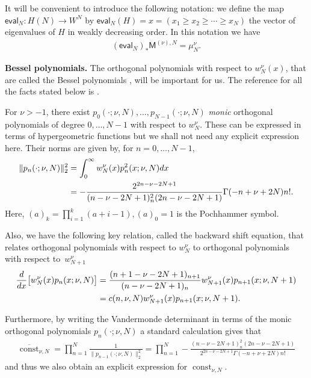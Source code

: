 \documentclass[11pt]{article}
\numberwithin{equation}{section}
\begin{document}
It will be convenient to introduce the following notation: we define the map $\mathsf{eval}_N\colon H(N) \to W^N$ by $\mathsf{eval}_N(H)=x=(x_1\ge x_2 \ge \cdots \ge x_N )$ the vector of eigenvalues of $H$ in weakly decreasing order. In this notation we have
\begin{gather*}
 (\mathsf{eval}_N )_*\mathsf{M}^{(\nu),N}=\mu_N^{\nu}.
\end{gather*}

{\bf Bessel polynomials.} The orthogonal polynomials with respect to $w_N^{\nu}(x)$, that are called the Bessel polynomials \cite{BesselPolynomials}, will be important for us. The reference for all the facts stated below is \cite[Chapter~9.13, pp.~244--247]{HypergeometricOrthogonalPolynomials}.

 For $\nu>-1$, there exist $p_0(\cdot;\nu,N),\dots,p_{N-1}(\cdot;\nu,N)$ \textit{monic} orthogonal polynomials of degree $0,\dots, N-1$ with respect to $w_N^{\nu}$. These can be expressed in terms of hypergeometric functions but we shall not need any explicit expression here. Their norms are given by, for $n=0, \dots, N-1$,
\begin{align*}
\|p_n(\cdot;\nu,N)\|_2^2&= \int_{0}^{\infty}w_N^{\nu}(x)p_n^2(x;\nu,N){\rm d}x\\
&=-\frac{2^{2n-\nu-2N+1}}{(n-\nu-2N+1)_n^2(2n-\nu-2N+1)}\Gamma(-n+\nu+2N)n!.
\end{align*}
Here, $(a)_k=\prod\limits_{i=1}^{k}(a+i-1), (a)_0=1$ is the Pochhammer symbol.

Also, we have the following key relation, called the backward shift equation, that relates orthogonal polynomials with respect to $w_N^{\nu}$ to orthogonal polynomials with respect to~$w_{N+1}^\nu$
\begin{align*}
\frac{{\rm d}}{{\rm d}x}\big[w_N^{\nu}(x)p_n(x;\nu,N)\big]&=\frac{(n+1-\nu-2N+1)_{n+1}}{(n-\nu-2N+1)_n}w_{N+1}^{\nu}(x)p_{n+1}(x;\nu, N+1)\nonumber\\
&=c(n,\nu,N)w_{N+1}^{\nu}(x)p_{n+1}(x;\nu, N+1).
\end{align*}

Furthermore, by writing the Vandermonde determinant in terms of the monic orthogonal polynomials $p_n(\cdot; \nu, N)$ a standard calculation gives that{\samepage
\begin{gather*}
\overline{\operatorname{const}}_{\nu, N}=\prod_{n=1}^{N}\frac{1}{\|p_{n-1}(\cdot;\nu,N)\|_2^2}=\prod_{n=1}^{N}-\frac{(n-\nu-2N+1)_n^2(2n-\nu-2N+1)}{2^{2n-\nu-2N+1}\Gamma(-n+\nu+2N)n!}
\end{gather*}
and thus we also obtain an explicit expression for $\operatorname{const}_{\nu, N}$.}
\end{document}
